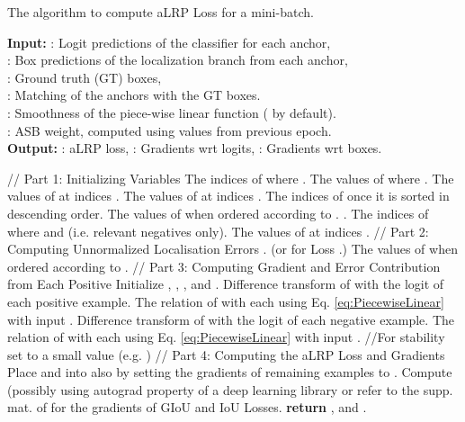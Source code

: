 \documentclass{article}
\begin{document}
\begin{algorithm}
\caption{The algorithm to compute aLRP Loss for a mini-batch. \label{alg:aLRPLoss}}
\begin{flushleft}
\hspace*{\algorithmicindent} \textbf{Input:} : Logit predictions of the classifier for each anchor, \\ 
\hspace*{15mm} : Box predictions of the localization branch from each anchor,\\
\hspace*{15mm} : Ground truth (GT) boxes, \\
\hspace*{15mm} : Matching of the anchors with the GT boxes. \\
\hspace*{15mm} : Smoothness of the piece-wise linear function ( by default). \\
\hspace*{15mm} : ASB weight, computed using  values from previous epoch. \\
 \hspace*{\algorithmicindent} \textbf{Output:} : aLRP loss, : Gradients wrt logits, : Gradients wrt boxes.
\end{flushleft}
\begin{algorithmic}[1]
\State // Part 1: Initializing Variables
\State  The indices of  where .
\State  The values of  where .
\State  The values of  at indices .
\State  The values of  at indices .
\State  The indices of  once it is sorted in descending order.
\State  The values of  when ordered according to .
\State .
\State  The indices of  where  and  (i.e. relevant negatives only).
\State  The values of  at indices .
\State // Part 2: Computing Unnormalized Localisation Errors
\State . (or  for  Loss \cite{GIoULoss}.)
\State  The values of  when ordered according to  .
\State 
\State // Part 3: Computing Gradient and Error Contribution from Each Positive
\State Initialize  , , ,  and . 
\ForEach {}
\State  Difference transform of  with the logit of each positive example.
\State  The relation of  with each  using Eq. \ref{eq:PiecewiseLinear} with input .
\State 
\State  Difference transform of  with the logit of each negative example.
\State   The relation of  with each  using Eq. \ref{eq:PiecewiseLinear} with input .
\State 
\State 
\State 
\State 
\State 
\If{} //For stability set  to a small value (e.g. )
\State 
\State 
\EndIf
\EndFor
\State // Part 4: Computing the aLRP Loss and Gradients
\State 
\State 
\State 
\State Place  and  into  also by setting the gradients of remaining examples to .
\State 
\State Compute  (possibly using autograd property of a deep learning library or refer to the supp. mat. of \cite{GIoULoss} for the gradients of GIoU and IoU Losses.
\State 
\State \textbf{return} ,  and  .
\end{algorithmic}
\end{algorithm} 
\end{document}
